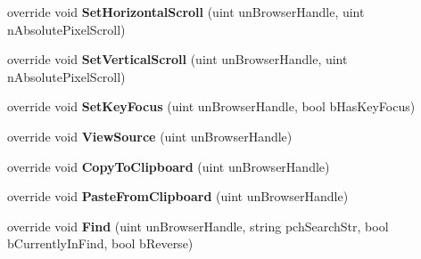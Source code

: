 \begin{DoxyCompactItemize}
\mbox{\label{class_valve_1_1_steamworks_1_1_c_steam_h_t_m_l_surface_a2fd2c6c71f4ab1841bbdc4888ccf9af4}} 
override void {\bfseries Set\+Horizontal\+Scroll} (uint un\+Browser\+Handle, uint n\+Absolute\+Pixel\+Scroll)
\item 
\mbox{\label{class_valve_1_1_steamworks_1_1_c_steam_h_t_m_l_surface_a9ac75426b021e5891bade7a05342b525}} 
override void {\bfseries Set\+Vertical\+Scroll} (uint un\+Browser\+Handle, uint n\+Absolute\+Pixel\+Scroll)
\item 
\mbox{\label{class_valve_1_1_steamworks_1_1_c_steam_h_t_m_l_surface_a7feb91252861df745c9db98c465cb85d}} 
override void {\bfseries Set\+Key\+Focus} (uint un\+Browser\+Handle, bool b\+Has\+Key\+Focus)
\item 
\mbox{\label{class_valve_1_1_steamworks_1_1_c_steam_h_t_m_l_surface_a852f65e47008f46a067ebf42f3743d80}} 
override void {\bfseries View\+Source} (uint un\+Browser\+Handle)
\item 
\mbox{\label{class_valve_1_1_steamworks_1_1_c_steam_h_t_m_l_surface_a9ca00d97757193e5b35cfc62f6512265}} 
override void {\bfseries Copy\+To\+Clipboard} (uint un\+Browser\+Handle)
\item 
\mbox{\label{class_valve_1_1_steamworks_1_1_c_steam_h_t_m_l_surface_a138becb995515d035fc331b4f41f4b26}} 
override void {\bfseries Paste\+From\+Clipboard} (uint un\+Browser\+Handle)
\item 
\mbox{\label{class_valve_1_1_steamworks_1_1_c_steam_h_t_m_l_surface_a05a3608bbaaccb83562405dca9822cdc}} 
override void {\bfseries Find} (uint un\+Browser\+Handle, string pch\+Search\+Str, bool b\+Currently\+In\+Find, bool b\+Reverse)
\item 
\mbox{\label{class_valve_1_1_steamworks_1_1_c_steam_h_t_m_l_surface_a53d15d7db2db0b5901530b53e016d7e8}} 

\end{DoxyCompactItemize}
